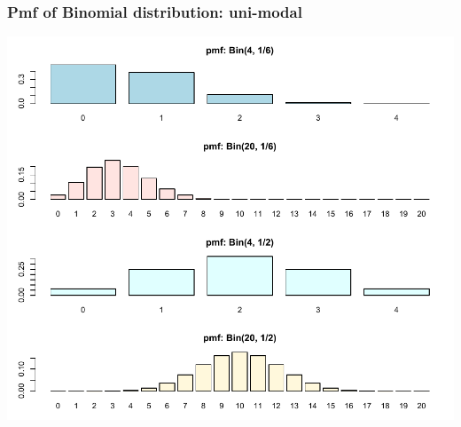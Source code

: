 \documentclass[slidestop,compress,mathserif]{beamer}
\begin{document}
\begin{frame}\frametitle{Pmf of Binomial distribution: uni-modal}

\vspace{-0.5cm}
\begin{center}
\includegraphics[scale = 0.6]{figures/pmf2}
\end{center}

\end{frame}


%
%
%
%
\end{document}
